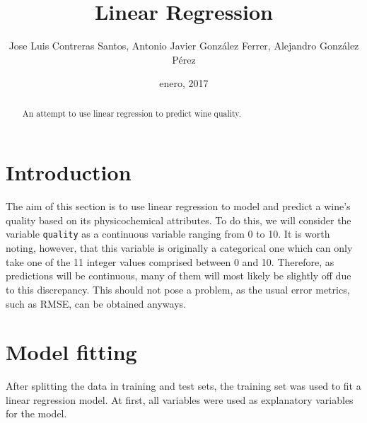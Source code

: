 \documentclass[12pt,]{article}
\title{Linear Regression}
\author{Jose Luis Contreras Santos, Antonio Javier González Ferrer, Alejandro
González Pérez}
\date{enero, 2017}
\newenvironment{Shaded}{\begin{snugshade}}{\end{snugshade}}
\newcommand{\KeywordTok}[1]{\textcolor[rgb]{0.13,0.29,0.53}{\textbf{{#1}}}}
\newcommand{\DataTypeTok}[1]{\textcolor[rgb]{0.13,0.29,0.53}{{#1}}}
\newcommand{\DecValTok}[1]{\textcolor[rgb]{0.00,0.00,0.81}{{#1}}}
\newcommand{\FloatTok}[1]{\textcolor[rgb]{0.00,0.00,0.81}{{#1}}}
\newcommand{\StringTok}[1]{\textcolor[rgb]{0.31,0.60,0.02}{{#1}}}
\newcommand{\CommentTok}[1]{\textcolor[rgb]{0.56,0.35,0.01}{\textit{{#1}}}}
\newcommand{\NormalTok}[1]{{#1}}
\begin{document}
\maketitle
\begin{abstract}
An attempt to use linear regression to predict wine quality.
\end{abstract}

\section{Introduction}\label{introduction}

The aim of this section is to use linear regression to model and predict
a wine's quality based on its physicochemical attributes. To do this, we
will consider the variable \texttt{quality} as a continuous variable
ranging from 0 to 10. It is worth noting, however, that this variable is
originally a categorical one which can only take one of the 11 integer
values comprised between 0 and 10. Therefore, as predictions will be
continuous, many of them will most likely be slightly off due to this
discrepancy. This should not pose a problem, as the usual error metrics,
such as RMSE, can be obtained anyways.

\section{Model fitting}\label{model-fitting}

After splitting the data in training and test sets, the training set was
used to fit a linear regression model. At first, all variables were used
as explanatory variables for the model.

\begin{Shaded}
\end{Shaded}
\end{document}
